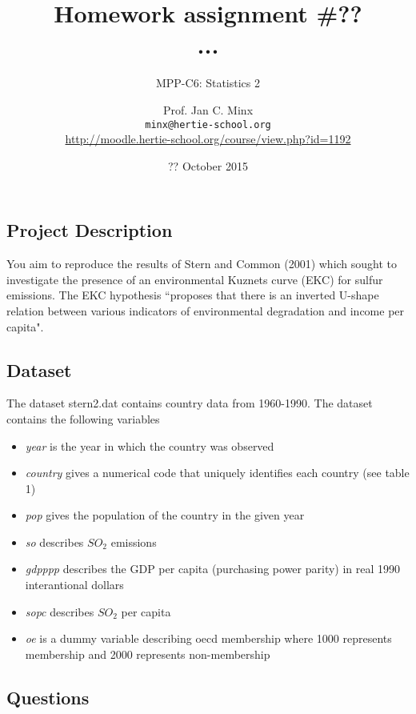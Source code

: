 \documentclass{scrartcl}
\begin{document}
	\title{Homework assignment \#??\\ ...}
	\subtitle{MPP-C6: Statistics 2}
	\author{Prof. Jan C. Minx\\ \texttt{minx@hertie-school.org} \\
		\url{http://moodle.hertie-school.org/course/view.php?id=1192}}
	\date{?? October 2015}
	
	\maketitle

	\subsection*{Project Description}
	You aim to reproduce the results of Stern and Common (2001) which sought to investigate the presence of an environmental Kuznets curve (EKC) for sulfur emissions. The EKC hypothesis ``proposes that there is an inverted U-shape relation between various indicators of environmental degradation and income per capita"\cite{stern2001there}.
	
	\subsection*{Dataset}
	The dataset stern2.dat contains country data from 1960-1990. The dataset contains the following variables
	\begin{itemize}
	\item \textit{year} is the year in which the country was observed 
	\item \textit{country} gives a numerical code that uniquely identifies each country (see table 1)
	\item \textit{pop} gives the population of the country in the given year
	\item \textit{so} describes \(SO_2\) emissions
	\item \textit{gdpppp} describes the GDP per capita (purchasing power parity) in real 1990 interantional dollars
	\item \textit{sopc} describes \(SO_2\) per capita
	\item \textit{oe} is a dummy variable describing oecd membership where 1000 represents membership and 2000 represents non-membership
	\end{itemize}
	
	\subsection*{Questions}
	
\end{document}
